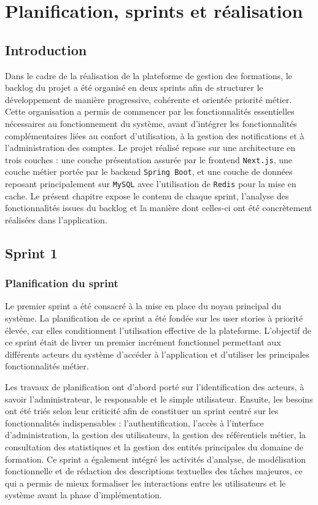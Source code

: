 \documentclass[12pt,a4paper]{report}
\begin{document}
\setcounter{chapter}{2}

\chapter{Planification, sprints et réalisation}

\section{Introduction}
Dans le cadre de la réalisation de la plateforme de gestion des formations, le backlog du projet a été organisé en deux sprints afin de structurer le développement de manière progressive, cohérente et orientée priorité métier. Cette organisation a permis de commencer par les fonctionnalités essentielles nécessaires au fonctionnement du système, avant d'intégrer les fonctionnalités complémentaires liées au confort d'utilisation, à la gestion des notifications et à l'administration des comptes. Le projet réalisé repose sur une architecture en trois couches : une couche présentation assurée par le frontend \texttt{Next.js}, une couche métier portée par le backend \texttt{Spring Boot}, et une couche de données reposant principalement sur \texttt{MySQL} avec l'utilisation de \texttt{Redis} pour la mise en cache. Le présent chapitre expose le contenu de chaque sprint, l'analyse des fonctionnalités issues du backlog et la manière dont celles-ci ont été concrètement réalisées dans l'application.

\section{Sprint 1}

\subsection{Planification du sprint}
Le premier sprint a été consacré à la mise en place du noyau principal du système. La planification de ce sprint a été fondée sur les user stories à priorité élevée, car elles conditionnent l'utilisation effective de la plateforme. L'objectif de ce sprint était de livrer un premier incrément fonctionnel permettant aux différents acteurs du système d'accéder à l'application et d'utiliser les principales fonctionnalités métier.

Les travaux de planification ont d'abord porté sur l'identification des acteurs, à savoir l'administrateur, le responsable et le simple utilisateur. Ensuite, les besoins ont été triés selon leur criticité afin de constituer un sprint centré sur les fonctionnalités indispensables : l'authentification, l'accès à l'interface d'administration, la gestion des utilisateurs, la gestion des référentiels métier, la consultation des statistiques et la gestion des entités principales du domaine de formation. Ce sprint a également intégré les activités d'analyse, de modélisation fonctionnelle et de rédaction des descriptions textuelles des tâches majeures, ce qui a permis de mieux formaliser les interactions entre les utilisateurs et le système avant la phase d'implémentation.
\end{document}

